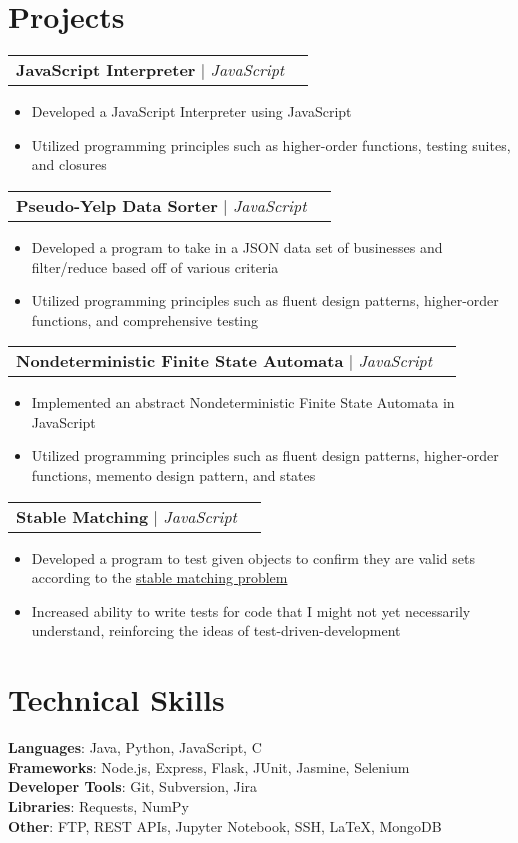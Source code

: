 \documentclass[letterpaper,11pt]{article}
\makeatletter
\newcommand{\resumeItem}[1]{
  \item\small{
    {#1 \vspace{-2pt}}
  }
}
\newcommand{\resumeProjectHeading}[2]{
    \item
    \begin{tabular*}{0.97\textwidth}{l@{\extracolsep{\fill}}r}
      \small#1 & #2 \\
    \end{tabular*}\vspace{-7pt}
}
\newcommand{\resumeItemListStart}{\begin{itemize}}
\newcommand{\resumeItemListEnd}{\end{itemize}\vspace{-5pt}}
\makeatother
\begin{document}
\section{Projects}
      \resumeProjectHeading
          {\textbf{JavaScript Interpreter} $|$ \emph{JavaScript}}{}
          \resumeItemListStart
            \resumeItem{Developed a JavaScript Interpreter using JavaScript}
            \resumeItem{Utilized programming principles such as higher-order functions, testing suites, and closures}
          \resumeItemListEnd
      \resumeProjectHeading
          {\textbf{Pseudo-Yelp Data Sorter} $|$ \emph{JavaScript}}{}
          \resumeItemListStart
            \resumeItem{Developed a program to take in a JSON data set of businesses and filter/reduce based off of various criteria}
            \resumeItem{Utilized programming principles such as fluent design patterns, higher-order functions, and comprehensive testing}\\
          \resumeItemListEnd
     \resumeProjectHeading
          {\textbf{Nondeterministic Finite State Automata} $|$ \emph{JavaScript}}{}
          \resumeItemListStart
            \resumeItem{Implemented an abstract Nondeterministic Finite State Automata in JavaScript}
            \resumeItem{Utilized programming principles such as fluent design patterns, higher-order functions, memento design pattern, and states}\\
          \resumeItemListEnd
     \resumeProjectHeading
        {\textbf{Stable Matching} $|$ \emph{JavaScript}}{}
        \resumeItemListStart
            \resumeItem{Developed a program to test given objects to confirm they are valid sets according to the  \href{https://en.wikipedia.org/wiki/Stable_marriage_problem}{stable matching problem}}\\
            \resumeItem{Increased ability to write tests for code that I might not yet necessarily understand, reinforcing the ideas of test-driven-development}
          \resumeItemListEnd



%
\section{Technical Skills}
 \begin{itemize}[leftmargin=0.15in, label={}]
    \small{\item{
     \textbf{Languages}{: Java, Python, JavaScript, C} \\
     \textbf{Frameworks}{: Node.js, Express, Flask, JUnit, Jasmine, Selenium} \\
     \textbf{Developer Tools}{: Git, Subversion, Jira} \\
     \textbf{Libraries}{: Requests, NumPy } \\
     \textbf{Other}{: FTP, REST APIs, Jupyter Notebook, SSH, LaTeX, MongoDB}
    }}
 \end{itemize}


\end{document}
